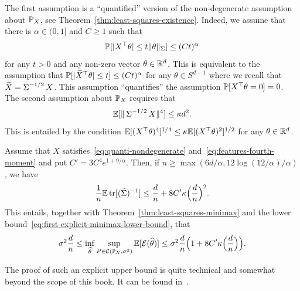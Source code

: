 The first assumption is a ``quantified'' version of the non-degenerate assumption about $\P_X$, see Theorem~\ref{thm:least-squares-existence}. 
Indeed, we assume that there is $\alpha \in (0, 1]$ and $C \geq 1$ such that
\begin{equation}
	\label{eq:quanti-nondegenerate}
	\P[ |X^\top \theta | \leq t \norm{\theta}_{\bSigma} ] \leq (C t)^\alpha
\end{equation}
for any $t > 0$ and any non-zero vector $\theta \in \R^d$. 
This is equivalent to the assumption that $\P[ |\wt X^\top \theta | \leq t] \leq (C t)^\alpha$ for any $\theta \in S^{d-1}$ where we recall that $\wt X = \bSigma^{-1/2} X$.
This assumption ``quantifies'' the assumption $\P[X^\top \theta = 0] = 0$.
The second assumption about $\P_X$ requires that
\begin{equation}
	\label{eq:features-fourth-moment}
	\E [\norm{\bSigma^{-1/2} X}^4] \leq \kappa d^2.
\end{equation}
This is entailed%
by the condition $\E[(X^\top \theta)^4]^{1/4} \leq \kappa \E[ (X^\top \theta)^2]^{1/2}$ for any $\theta \in \R^d$.%
\begin{theorem}
	Assume that $X$ satisfies~\eqref{eq:quanti-nondegenerate} and~\eqref{eq:features-fourth-moment} and put $C' = 3 C^4 e^{1 + 9 / \alpha}$. 
	Then, if $n \geq \max(6 d / \alpha, 12 \log(12 / \alpha) / \alpha)$, we have
	\begin{equation*}
		\frac 1n \E \tr [ (\wt \bSigma)^{-1}] \leq \frac dn 
		+ 8 C' \kappa \Big( \frac dn \Big)^2.
	\end{equation*}
	This entails, together with Theorem~\ref{thm:least-squares-minimax} and the lower bound~\eqref{eq:first-explicit-minimax-lower-bound}, that
	\begin{equation*}
		\sigma^2 \frac dn \leq \inf_{\wh \theta} \sup_{P \in \cC(\P_X, \sigma^2)} \E [\cE(\wh \theta)] \leq \sigma^2 \frac dn 
		\Big( 1 + 8 C' \kappa \Big( \frac dn \Big) \Big).
	\end{equation*}
\end{theorem}
The proof of such an explicit upper bound is quite technical and somewhat beyond the scope of this book. It can be found in~.

